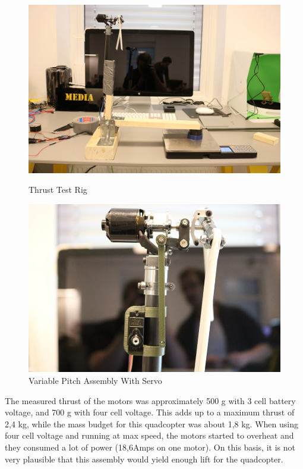 \begin{figure}[h]
        \centering
         \begin{minipage}[b]{0.4\textwidth}
            \includegraphics[width = 1\textwidth]{VAPIQ-PICTURES/VPQtestRig}
              \caption{Thrust Test Rig}
            \label{fig:testrig}
        \end{minipage}
        \hfill
        \begin{minipage}[b]{0.4\textwidth}
            \includegraphics[width = 1\textwidth]{VAPIQ-PICTURES/VpMechanism}
            \caption{Variable Pitch Assembly With Servo}
            \label{fig:testrig2}
        \end{minipage}
\end{figure}

\clearpage 

The measured thrust of the motors was approximately 500 g with 3 cell battery voltage, and 700 g with four cell voltage. This adds up to a maximum thrust of 2,4 kg, while the mass budget for this quadcopter was about 1,8 kg. When using four cell voltage and running at max speed, the motors started to overheat and they consumed a lot of power (18,6Amps on one motor). On this basis, it is not very plausible that this assembly would yield enough lift for the quadcopter. \bigskip

